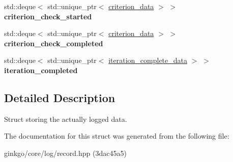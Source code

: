 \begin{DoxyCompactItemize}
\item 
\mbox{\label{structgko_1_1log_1_1Record_1_1logged__data_abfe68110796c0a094c937d3a8787cc04}} 
std\+::deque$<$ std\+::unique\+\_\+ptr$<$ \hyperlink{structgko_1_1log_1_1criterion__data}{criterion\+\_\+data} $>$ $>$ {\bfseries criterion\+\_\+check\+\_\+started}
\item 
\mbox{\label{structgko_1_1log_1_1Record_1_1logged__data_abf13cae8d7e797ae6c2b4ddf9a9cb33a}} 
std\+::deque$<$ std\+::unique\+\_\+ptr$<$ \hyperlink{structgko_1_1log_1_1criterion__data}{criterion\+\_\+data} $>$ $>$ {\bfseries criterion\+\_\+check\+\_\+completed}
\item 
\mbox{\label{structgko_1_1log_1_1Record_1_1logged__data_a54f71b0aecebe7a7957eb5cfba7395e3}} 
std\+::deque$<$ std\+::unique\+\_\+ptr$<$ \hyperlink{structgko_1_1log_1_1iteration__complete__data}{iteration\+\_\+complete\+\_\+data} $>$ $>$ {\bfseries iteration\+\_\+completed}
\end{DoxyCompactItemize}


\subsection{Detailed Description}
Struct storing the actually logged data. 

The documentation for this struct was generated from the following file\+:\begin{DoxyCompactItemize}
\item 
ginkgo/core/log/record.\+hpp (3dac45a5)\end{DoxyCompactItemize}

